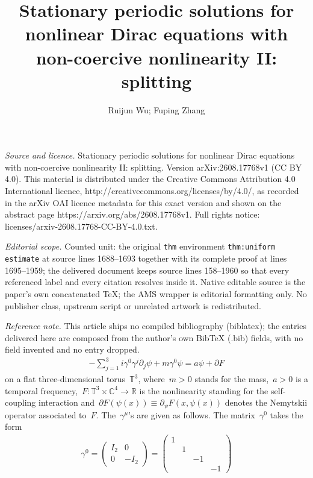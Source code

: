 \documentclass[10pt,a4paper]{amsart}
\newcommand{\p}{\partial}
\newcommand{\R}{\mathbb{R}}
\newcommand{\C}{\mathbb{C}}
\newcommand{\T}{\mathbb{T}}
\begin{document}
\title[Stationary periodic solutions for nonlinear Dirac equations ]{Stationary periodic solutions for nonlinear Dirac equations with non-coercive nonlinearity II: splitting}
\author{Ruijun Wu; Fuping Zhang}
\date{}
\maketitle
\noindent\emph{Source and licence.} Stationary periodic solutions for nonlinear Dirac equations with non-coercive nonlinearity II: splitting. Version arXiv:2608.17768v1 (CC BY 4.0). This material is distributed under the Creative Commons Attribution 4.0 International licence, http://creativecommons.org/licenses/by/4.0/, as recorded in the arXiv OAI licence metadata for this exact version and shown on the abstract page https://arxiv.org/abs/2608.17768v1. Full rights notice: licenses/arxiv-2608.17768-CC-BY-4.0.txt.\par\smallskip
\noindent\textit{Editorial scope.} Counted unit: the original \texttt{thm} environment \texttt{thm:uniform estimate} at source lines 1688--1693 together with its complete proof at lines 1695--1959; the delivered document keeps source lines 158--1960 so that every referenced label and every citation resolves inside it. Native editable source is the paper's own concatenated TeX; the AMS wrapper is editorial formatting only. No publisher class, upstream script or unrelated artwork is redistributed.
\par\smallskip\noindent\textit{Reference note.} This article ships no compiled bibliography (biblatex); the entries delivered here are composed from the author's own BibTeX (.bib) fields, with no field invented and no entry dropped.
\begin{align}\label{eq:NDE-spatial}
    -\sum_{j=1}^3 i\gamma^0\gamma^j\p_j\psi + m\gamma^0\psi =a\psi + \p F
\end{align}
on a flat three-dimensional torus~$\T^3$, where~$m>0$ stands for the mass,~$a>0$ is a temporal frequency,~$F\colon \T^3\times \C^4\to \R$ is the nonlinearity standing for the self-coupling interaction and~$\p F(\psi(x))\equiv \p_\psi F(x,\psi(x))$ denotes the Nemytskii operator associated to~$F$.
The~$\gamma^\mu$'s are given as follows.
The matrix~$\gamma^0$ takes the form
\begin{align}
    \gamma^0= \begin{pmatrix} I_2 & 0 \\ 0 & -I_2\end{pmatrix}
    =\begin{pmatrix}
        1 & & &  \\ & 1 & & \\ & & -1 & \\ & &  & -1
    \end{pmatrix}
\end{align}
\end{document}

